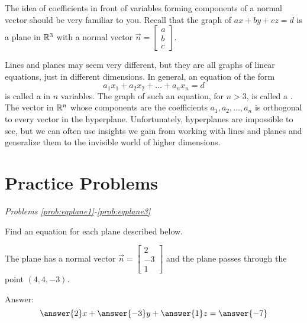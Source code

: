 \documentclass{ximera}
\begin{document}

\begin{onlineOnly}
\begin{center} 
\end{center}
\end{onlineOnly}

The idea of coefficients in front of variables forming components of a normal vector should be very familiar to you.  Recall that the graph of $ax+by+cz=d$ is a plane in $\mathbb{R}^3$ with a normal vector $\vec{n}=\begin{bmatrix}a\\b\\c\end{bmatrix}$.

Lines and planes may seem very different, but they are all graphs of linear equations, just in different dimensions.  In general, an equation of the form
$$a_1x_1+a_2x_2+\dots +a_nx_n=d$$
is called a  in $n$ variables.  The graph of such an equation, for $n>3$, is called a .  The vector in $\mathbb{R}^n$ whose components are the coefficients $a_1, a_2, \dots ,a_n$ is orthogonal to every vector in the hyperplane.  Unfortunately, hyperplanes are impossible to see, but we can often use insights we gain from working with lines and planes and generalize them to the invisible world of higher dimensions.


\section*{Practice Problems}

\emph{Problems \ref{prob:eqplane1}-\ref{prob:eqplane3}}

Find an equation for each plane described below.

  \begin{problem}\label{prob:eqplane1}
  The plane has a normal vector $\vec{n}=\begin{bmatrix}2\\-3\\1\end{bmatrix}$ and the plane passes through the point $(4, 4, -3)$.
  
  Answer: $$\answer{2}x+\answer{-3}y+\answer{1}z=\answer{-7}$$
  \end{problem}
  
\end{document}
